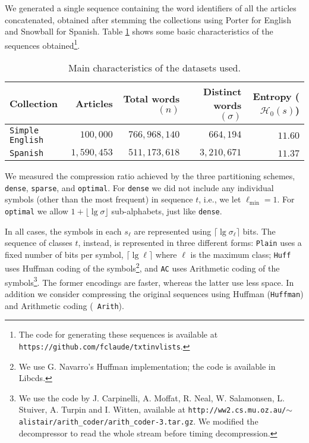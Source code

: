 \documentclass[11pt]{article}
\newcommand{\HH}{\mathcal{H}}
\newcommand{\Ho}{\HH_0}
\begin{document}
We generated a single sequence containing the word identifiers of all the
articles concatenated, obtained after stemming the collections using
Porter for English and Snowball for Spanish. Table \ref{tab:data}
shows some basic characteristics of the sequences obtained\footnote{The code for generating these sequences is available at
\texttt{https://github.com/fclaude/txtinvlists}.}.

\begin{table}
\begin{center}
\begin{tabular}{l|r|r|r|r}
Collection & Articles & Total words $(n)$ & Distinct words $(\sigma)$
& Entropy ($\Ho(s)$) \\ \hline
{\tt Simple English} & $100{,}000$ & $766{,}968{,}140$ & $664{,}194$ & $11.60$ \\
{\tt Spanish} & $1{,}590{,}453$ & $511{,}173{,}618$ & $3{,}210{,}671$ & $11.37$ 
\end{tabular}
\caption{Main characteristics of the datasets used.}
\label{tab:data}
\end{center}
\end{table}

We measured the compression ratio achieved by the three partitioning
schemes, {\tt dense}, {\tt sparse}, and {\tt optimal}. For {\tt dense} we
did not include any individual symbols (other than the most frequent) in
sequence $t$, i.e., we let $\ell_\textrm{min}=1$. For {\tt optimal} we 
allow $1+\lfloor \lg\sigma \rfloor$ sub-alphabets, just like {\tt dense}.

In all cases, the symbols in each $s_\ell$ are represented using $\lceil \lg
\sigma_\ell \rceil$ bits. The sequence of classes $t$, instead, is represented
in three different forms: {\tt Plain} uses a fixed number of bits per symbol,
$\lceil \lg \ell \rceil$ where $\ell$ is the maximum class; {\tt Huff} uses
Huffman coding of the symbols\footnote{We use G. Navarro's Huffman
implementation; the code is available in {\sc Libcds}.}, and {\tt AC} uses
Arithmetic coding of the symbols\footnote{We use the code by J. Carpinelli,
A. Moffat, R. Neal, W. Salamonsen, L. Stuiver, A. Turpin
and I. Witten, available at 
{\tt http://ww2.cs.mu.oz.au/$\sim$alistair/arith\_coder/arith\_coder-3.tar.gz}.
We modified the decompressor to read the whole
stream before timing decompression.}. The former encodings are faster,
whereas the latter use less space. In addition we consider compressing the
original sequences using Huffman ({\tt Huffman}) and Arithmetic coding ({\tt
Arith}).
\end{document}
